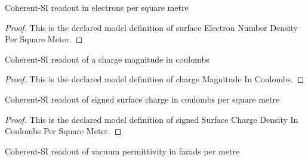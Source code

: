 \begin{definition}
  \label{def:physics:phyx-mini-0849:phyxminiproblems-problemphyxmini0849-surfaceelectronnumberdensitypersquaremeter}
  Coherent-SI readout in electrons per square metre
\end{definition}
\begin{proof}
  This is the declared model definition of surface Electron Number Density Per Square Meter.
\end{proof}
\begin{definition}
  \label{def:physics:phyx-mini-0849:phyxminiproblems-problemphyxmini0849-chargemagnitudeincoulombs}
  Coherent-SI readout of a charge magnitude in coulombs
\end{definition}
\begin{proof}
  This is the declared model definition of charge Magnitude In Coulombs.
\end{proof}
\begin{definition}
  \label{def:physics:phyx-mini-0849:phyxminiproblems-problemphyxmini0849-signedsurfacechargedensityincoulombspersquaremeter}
  Coherent-SI readout of signed surface charge in coulombs per square metre
\end{definition}
\begin{proof}
  This is the declared model definition of signed Surface Charge Density In Coulombs Per Square Meter.
\end{proof}
\begin{definition}
  \label{def:physics:phyx-mini-0849:phyxminiproblems-problemphyxmini0849-vacuumpermittivityinfaradspermeter}
  Coherent-SI readout of vacuum permittivity in farads per metre
\end{definition}
